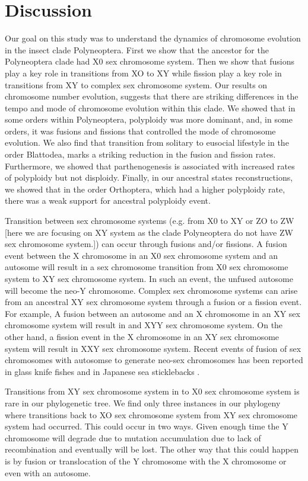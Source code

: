 \section{Discussion}
Our goal on this study was to understand the dynamics of chromosome evolution in the insect clade Polyneoptera. 
First we show that the ancestor for the Polyneoptera clade had X0 sex chromosome system. 
Then we show that fusions play a key role in transitions from XO to XY while fission play a key role in transitions from XY to complex sex chromosome system.
Our results on chromosome number evolution, suggests that there are striking differences in the tempo and mode of chromosome evolution within this clade.
We showed that in some orders within Polyneoptera, polyploidy was more dominant, and, in some orders, it was fusions and fissions that controlled the mode of chromosome evolution.
We also find that transition from solitary to eusocial lifestyle in the order Blattodea, marks a striking reduction in the fusion and fission rates.
Furthermore, we showed that parthenogenesis is associated with increased rates of polyploidy but not disploidy.
Finally, in our ancestral states reconstructions, we showed that in the order Orthoptera, which had a higher polyploidy rate, there was a weak support for ancestral polyploidy event. 

Transition between sex chromosome systems (e.g. from X0 to XY or ZO to ZW [here we are focusing on XY system as the clade Polyneoptera do not have ZW sex chromosome system.]) can occur through fusions and/or fissions.
A fusion event between the X chromosome in an X0 sex chromosome system and an autosome will result in a sex chromosome transition from X0 sex chromosome system to XY sex chromosome system. In such an event, the unfused autosome will become the neo-Y chromosome. 
Complex sex chromosome systems can arise from an ancestral XY sex chromosome system through a fusion or a fission event. 
For example, A fusion between an autosome and an X chromosome in an XY sex chromosome system will result in and XYY sex chromosome system. 
On the other hand, a fission event in the X chromosome in an XY sex chromosome system will result in XXY sex chromosome system. 
Recent events of fusion of sex chromosomes with autosomse to generate neo-sex chromosomes has been reported in glass knife fishes \citep{henning2011independent} and in Japanese sea sticklebacks \citep{kitano2012}.

Transitions from XY sex chromosome system in to X0 sex chromosome system is rare in our phylogenetic tree. 
We find only three instances in our phylogeny where transitions back to XO sex chromosome system from XY sex chromosome system had occurred. 
This could occur in two ways.
Given enough time the Y chromosome will degrade due to mutation accumulation due to lack of recombination and eventually will be lost.
The other way that this could happen is by fusion or translocation of the Y chromosome with the X chromosome or even with an autosome. 

